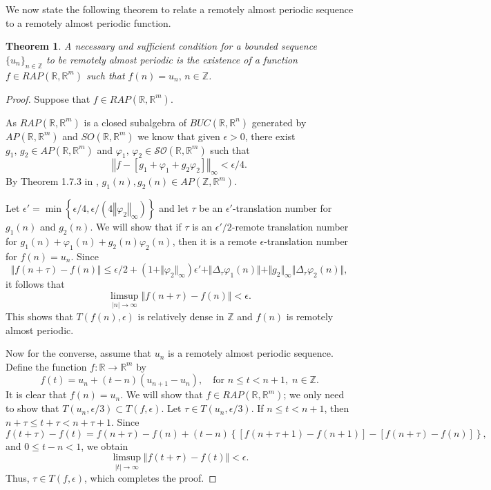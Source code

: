 \documentclass[english,,reqno]{amsart}
\numberwithin{equation}{section}
\theoremstyle{plain}
\newtheorem{thm}{Theorem}[section]
\theoremstyle{definition}
\theoremstyle{remark}
\begin{document}
We now state the following theorem to relate a remotely almost periodic sequence to a remotely almost periodic function.


\begin{thm}\label{RAP_cont_RAP_disc}
A necessary and sufficient condition for a bounded sequence $\{u_{n}\}_{n\in\mathbb{Z}}$ to be remotely almost periodic is the existence of a function $f\in RAP\left(\mathbb{R},\mathbb{R}^{m}\right)$ such that $f(n)=u_{n},\, n\in\mathbb{Z}$.
\end{thm}
\begin{proof}
Suppose that $f\in RAP(\mathbb{R},\mathbb{R}^{m})$.  
 
As $RAP(\mathbb{R},\mathbb{R}^{m})$ is a closed subalgebra of $BUC(\mathbb{R},\mathbb{R}^n)$ generated by $AP(\mathbb{R},\mathbb{R}^{m})$ and $SO(\mathbb{R},\mathbb{R}^{m})$ we know that given $\epsilon>0$, there exist $g_{1},\, g_{2}\in AP\left(\mathbb{R},\mathbb{R}^{m}\right)$  
and $\varphi_{1},\,\varphi_{2}\in \mathcal{SO}\left(\mathbb{R},\mathbb{R}^{m}\right)$  
such that  
\[
\left\Vert f-\left[g_{1}+\varphi_{1}+g_{2}\varphi_{2}\right]\right\Vert_{\infty} <\epsilon/4.
\]  
By Theorem 1.7.3 in \cite{zhang_APTE}, $g_1(n), g_2(n)\in AP(\mathbb{Z},\mathbb{R}^{m})$.

Let $\epsilon'=\min\left\{ \epsilon/4,\epsilon/\left(4\left\Vert \varphi_{2}\right\Vert_{\infty}\right)\right\}$  
and let $\tau$ be an $\epsilon'$-translation number for $g_{1}(n)$ and $g_{2}(n)$.  
We will show that if $\tau$ is an $\epsilon'/2$-remote translation number  
for $g_{1}(n)+\varphi_{1}(n)+g_{2}(n)\varphi_{2}(n)$,  
then it is a remote $\epsilon$-translation number for $f(n)=u_{n}$. Since  
\[
\Vert f(n+\tau)-f(n)\Vert \leq \epsilon /2 +(1+\Vert \varphi_{2}\Vert_{\infty} )\epsilon' +\Vert \Delta_{\tau}\varphi_{1}(n)\Vert +\Vert g_{2}\Vert_{\infty} \Vert \Delta_{\tau}\varphi_{2}(n)\Vert,
\]  
it follows that  
\[
\limsup_{\left|n\right|\rightarrow\infty}\Vert f(n+\tau)-f(n)\Vert<\epsilon.
\]  
This shows that $T\left(f(n),\epsilon\right)$ is relatively dense in $\mathbb{Z}$ and $f(n)$ is remotely almost periodic.

Now for the converse, assume that $u_n$ is a remotely almost periodic sequence.  
Define the function $f:\mathbb{R} \to \mathbb{R}^m$ by  
\[
f(t) = u_n + (t - n)(u_{n+1} - u_n),\quad\text{for } n \leq t < n+1,\; n\in\mathbb{Z}.
\]  
It is clear that $f(n) = u_n$. We will show that $f \in RAP(\mathbb{R},\mathbb{R}^m)$;  
we only need to show that $T(u_n, \epsilon/3) \subset T(f, \epsilon)$.  
Let $\tau \in T(u_n, \epsilon/3)$. If $n \leq t < n+1$, then $n+\tau \leq t+\tau < n+\tau+1$.  
Since  
\[
f(t+\tau)-f(t)= f(n+\tau) - f(n) + (t - n)\left\{ [f(n+\tau+1) - f(n+1)] - [f(n+\tau) - f(n)] \right\},
\]
and $0 \leq t - n < 1$, we obtain  
\[
\limsup_{\left|t\right|\rightarrow\infty} \Vert f(t+\tau) - f(t) \Vert < \epsilon.
\]  
Thus, $\tau \in T(f,\epsilon)$, which completes the proof.
\end{proof}
\end{document}
